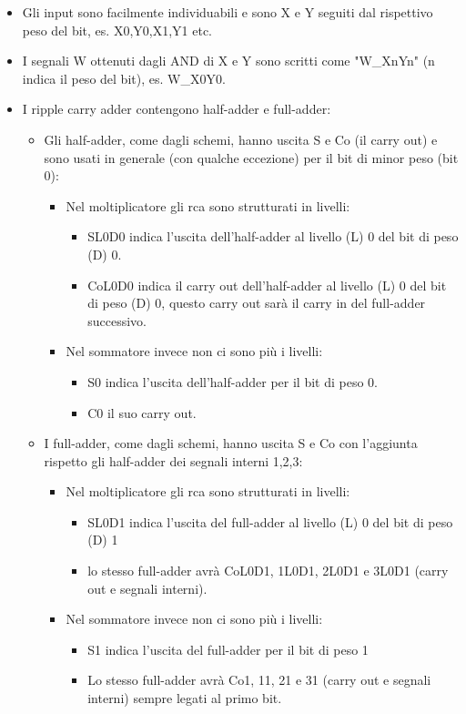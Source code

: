 \documentclass[12pt, letterpaper]{article}
\begin{document}
\begin{itemize}

\item Gli input sono facilmente individuabili e sono X e Y seguiti dal rispettivo peso del bit, es. X0,Y0,X1,Y1 etc.
\item I segnali W ottenuti dagli AND di X e Y sono scritti come "W\_XnYn" (n indica il peso del bit), es. W\_X0Y0.
\item I ripple carry adder contengono half-adder e full-adder:

\begin{itemize}

\item Gli half-adder, come dagli schemi, hanno uscita S e Co (il carry out) e sono usati in generale (con qualche eccezione) per il bit di minor peso (bit 0):
\begin{itemize}
\item Nel moltiplicatore gli rca sono strutturati in livelli:
\begin{itemize}
\item SL0D0 indica l'uscita dell'half-adder al livello (L) 0 del bit di peso (D) 0.
\item CoL0D0 indica il carry out dell'half-adder al livello (L) 0 del bit di peso (D) 0, questo carry out sarà il carry in del full-adder successivo.
\end{itemize}
\item Nel sommatore invece non ci sono più i livelli:
\begin{itemize} 
\item S0 indica l'uscita dell'half-adder per il bit di peso 0.
\item C0 il suo carry out.
\end{itemize}
\end{itemize}

\item I full-adder, come dagli schemi, hanno uscita S e Co con l'aggiunta rispetto gli half-adder dei segnali interni 1,2,3:
\begin{itemize}
\item Nel moltiplicatore gli rca sono strutturati in livelli: 
\begin{itemize}
\item SL0D1 indica l'uscita del full-adder al livello (L) 0 del bit di peso (D) 1
\item lo stesso full-adder avrà CoL0D1, 1L0D1, 2L0D1 e 3L0D1 (carry out e segnali interni).
\end{itemize}
\item Nel sommatore invece non ci sono più i livelli: 
\begin{itemize}
\item S1 indica l'uscita del full-adder per il bit di peso 1
\item Lo stesso full-adder avrà Co1, 11, 21 e 31 (carry out e segnali interni) sempre legati al primo bit.
\end{itemize}
\end{itemize}

\end{itemize}

\end{itemize}
\end{document}
